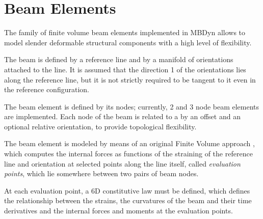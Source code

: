 %
%
%
%
%
% 
%
%

\section{Beam Elements}
\label{sec:EL:BEAM}
The family of finite volume beam elements implemented in MBDyn
allows to model slender deformable structural components 
with a high level of flexibility.

The beam is defined by a reference line and by a manifold
of orientations attached to the line.
It is assumed that the direction 1 of the orientations lies along
the reference line, but it is not strictly required to be tangent
to it even in the reference configuration.

The beam element is defined by its nodes; currently, 2 and 3 node 
beam elements are implemented.
Each node of the beam is related to a  by an offset
and an optional relative orientation, to provide topological flexibility.

The beam element is modeled by means of an original Finite Volume approach
\cite{FV-AIAA}, which computes the internal forces as functions 
of the straining of the reference line and orientation at selected points
along the line itself, called \emph{evaluation points},
which lie somewhere between two pairs of beam nodes.

At each evaluation point, a 6D constitutive law must be defined,
which defines the relationship between the strains, the curvatures
of the beam and their time derivatives
and the internal forces and moments at the evaluation points.

